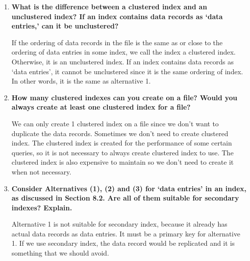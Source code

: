 \begin{enumerate}
\item {\bf What is the difference between a clustered index and an unclustered index? If an index contains data records as ‘data entries,’ can it be unclustered?}

If the ordering of data records in the file is the same as or close to the ordering of data entries in some index, we call the index a clustered index.  Otherwise, it is an unclustered index.  If an index contains data records as `data entries', it cannot be unclustered since it is the same ordering of index.  In other words, it is the same as alternative 1.

\item {\bf How many clustered indexes can you create on a file? Would you always create at least one clustered index for a file?}

We can only create 1 clustered index on a file since we don't want to duplicate the data records.  Sometimes we don't need to create clustered index.  The clustered index is created for the performance of some certain queries, so it is not necessary to always create clustered index to use.  The clustered index is also expensive to maintain so we don't need to create it when not necessary.

\item {\bf Consider Alternatives (1), (2) and (3) for ‘data entries’ in an index, as discussed in Section 8.2. Are all of them suitable for secondary indexes? Explain.}

Alternative 1 is not suitable for secondary index, because it already has actual data records as data entries.  It must be a primary key for alternative 1.  If we use secondary index, the data record would be replicated and it is something that we should avoid.

\end{enumerate}

